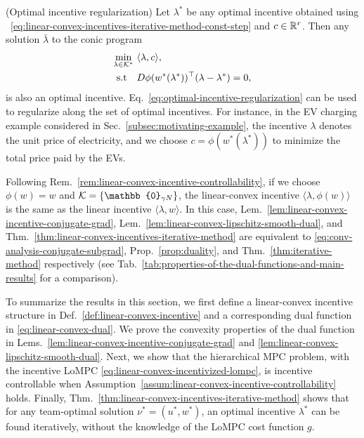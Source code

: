 \begin{remark} (Optimal incentive regularization)
\label{rem:optimal-incentive-regularization}
Let $\lambda^*$ be any optimal incentive obtained using ~\eqref{eq:linear-convex-incentives-iterative-method-const-step} and $c \in \mathbb{R}^{r}$.
Then any solution $\bar{\lambda}$ to the conic program
\begin{equation}
\label{eq:optimal-incentive-regularization}
\begin{split}
    \min_{\lambda \in \mathcal{K}^*} \ & \langle \lambda, c \rangle, \\
    \text{s.t} \quad & D\phi(w^*(\lambda^*))^\top (\lambda - \lambda^*) = 0,
\end{split}
\end{equation}
is also an optimal incentive.
Eq.~\eqref{eq:optimal-incentive-regularization} can be used to regularize along the set of optimal incentives.
For instance, in the EV charging example considered in Sec.~\ref{subsec:motivating-example}, the incentive $\lambda$ denotes the unit price of electricity, and we choose $c = \phi(w^*(\lambda^*))$ to minimize the total price paid by the EVs.
\end{remark}

\begin{remark}
Following Rem.~\ref{rem:linear-convex-incentive-controllability}, if we choose $\phi(w) = w$ and $\mathset{K} = \{\mathbb{0}_{\Nw\horizon}\}$, the linear-convex incentive $\langle \lambda, \phi(w)\rangle$ is the same as the linear incentive $\langle \lambda, w\rangle$.
In this case, Lem.~\ref{lem:linear-convex-incentive-conjugate-grad}, Lem.~\ref{lem:linear-convex-lipschitz-smooth-dual}, and Thm.~\ref{thm:linear-convex-incentives-iterative-method} are equivalent to \eqref{eq:conv-analysis-conjugate-subgrad}, Prop.~\ref{prop:duality}, and Thm.~\ref{thm:iterative-method} respectively (see Tab.~\ref{tab:properties-of-the-dual-functions-and-main-results} for a comparison).
\end{remark}


To summarize the results in this section, we first define a linear-convex incentive structure in Def.~\ref{def:linear-convex-incentive} and a corresponding dual function in \eqref{eq:linear-convex-dual}.
We prove the convexity properties of the dual function in Lems.~\ref{lem:linear-convex-incentive-conjugate-grad} and \ref{lem:linear-convex-lipschitz-smooth-dual}.
Next, we show that the hierarchical MPC problem, with the incentive LoMPC \eqref{eq:linear-convex-incentivized-lompc}, is incentive controllable when Assumption~\ref{assum:linear-convex-incentive-controllability} holds.
Finally, Thm.~\ref{thm:linear-convex-incentives-iterative-method} shows that for any team-optimal solution $\nu^* = (u^*, w^*)$, an optimal incentive $\lambda^*$ can be found iteratively, without the knowledge of the LoMPC cost function $g$.

